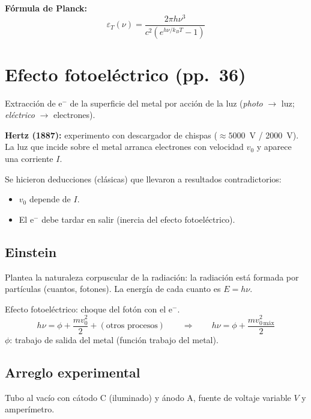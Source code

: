\documentclass[11pt,a4paper]{article}
\newcommand{\pags}[1]{{\normalfont\small\color{gris}(pp.~#1)}}
\begin{document}
\textbf{Fórmula de Planck:}
\[
\boxed{\varepsilon_T(\nu)=\frac{2\pi h\nu^3}{c^2\left(e^{h\nu/k_BT}-1\right)}}
\]

\section{Efecto fotoeléctrico \pags{36}}

Extracción de e$^-$ de la superficie del metal por acción de la luz (\emph{photo} $\rightarrow$ luz;
\emph{eléctrico} $\rightarrow$ electrones).

\textbf{Hertz (1887):} experimento con descargador de chispas ($\approx5000$~V / 2000~V). La luz que incide
sobre el metal arranca electrones con velocidad $v_0$ y aparece una corriente $I$.

Se hicieron deducciones (clásicas) que llevaron a resultados contradictorios:
\begin{itemize}
  \item $v_0$ depende de $I$.
  \item El e$^-$ debe tardar en salir (inercia del efecto fotoeléctrico).
\end{itemize}

\subsection{Einstein}
Plantea la naturaleza corpuscular de la radiación: la radiación está formada por partículas (cuantos, fotones).
La energía de cada cuanto es $E=h\nu$.

Efecto fotoeléctrico: choque del fotón con el e$^-$.
\[
h\nu=\phi+\frac{mv_0^2}{2}+(\text{otros procesos})
\qquad\Rightarrow\qquad
\boxed{h\nu=\phi+\frac{mv_{0\,\text{máx}}^2}{2}}
\]
$\phi$: trabajo de salida del metal (función trabajo del metal).

\subsection{Arreglo experimental}
Tubo al vacío con cátodo C (iluminado) y ánodo A, fuente de voltaje variable $V$ y amperímetro.
\end{document}
